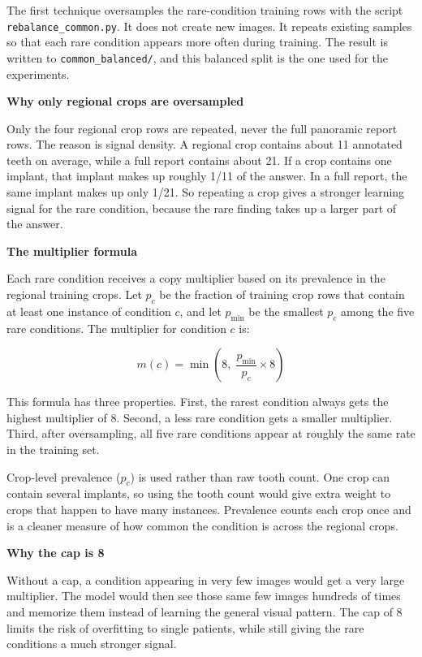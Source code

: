 \documentclass[a4paper,12pt]{report}
\newcommand{\minisection}[1]{%
  \vspace{1ex}
  \noindent\textbf{#1}\par
  \vspace{0.5ex}
}
\begin{document}
The first technique oversamples the rare-condition training rows with the script \texttt{rebalance\_common.py}. It does not create new images. It repeats existing samples so that each rare condition appears more often during training. The result is written to \texttt{common\_balanced/}, and this balanced split is the one used for the experiments.

\minisection{Why only regional crops are oversampled}

Only the four regional crop rows are repeated, never the full panoramic report rows. The reason is signal density. A regional crop contains about 11 annotated teeth on average, while a full report contains about 21. If a crop contains one implant, that implant makes up roughly 1/11 of the answer. In a full report, the same implant makes up only 1/21. So repeating a crop gives a stronger learning signal for the rare condition, because the rare finding takes up a larger part of the answer.

\newpage
\minisection{The multiplier formula}

Each rare condition receives a copy multiplier based on its prevalence in the regional training crops. Let $p_c$ be the fraction of training crop rows that contain at least one instance of condition $c$, and let $p_{\min}$ be the smallest $p_c$ among the five rare conditions. The multiplier for condition $c$ is:

\begin{equation}
m(c) = \min\!\left(8,\; \frac{p_{\min}}{p_c} \times 8\right)
\label{eq:multiplier}
\end{equation}

This formula has three properties. First, the rarest condition always gets the highest multiplier of 8. Second, a less rare condition gets a smaller multiplier. Third, after oversampling, all five rare conditions appear at roughly the same rate in the training set.

Crop-level prevalence ($p_c$) is used rather than raw tooth count. One crop can contain several implants, so using the tooth count would give extra weight to crops that happen to have many instances. Prevalence counts each crop once and is a cleaner measure of how common the condition is across the regional crops.

\minisection{Why the cap is 8}

Without a cap, a condition appearing in very few images would get a very large multiplier. The model would then see those same few images hundreds of times and memorize them instead of learning the general visual pattern. The cap of 8 limits the risk of overfitting to single patients, while still giving the rare conditions a much stronger signal.
\end{document}
